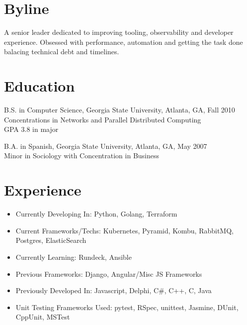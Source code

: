 \documentclass[margin]{res}
\begin{document}

\address{217 Rockyford Rd NE \\ Atlanta, GA 30317 \\
        (678) 773-1545 }

\begin{resume}

\section{Byline}
    A senior leader dedicated to improving tooling, observability and developer experience. Obsessed with
    performance, automation and getting the task done balacing technical debt and timelines.

\section{Education}
    B.S. in Computer Science, Georgia State University, Atlanta, GA, Fall 2010  \\
    Concentrations in Networks and Parallel Distributed Computing \\
    GPA 3.8 in major

    B.A. in Spanish, Georgia State University, Atlanta, GA, May 2007 \\
    Minor in Sociology with Concentration in Business


\section{Experience}
    \begin{itemize} \itemsep -2pt  %
        \item Currently Developing In: Python, Golang, Terraform
        \item Current Frameworks/Techs: Kubernetes, Pyramid, Kombu, RabbitMQ, Postgres, ElasticSearch
        \item Currently Learning: Rundeck, Ansible
        \item Previous Frameworks: Django, Angular/Misc JS Frameworks
        \item Previously Developed In: Javascript, Delphi, C\#, C++, C, Java
        \item Unit Testing Frameworks Used: pytest, RSpec, unittest, Jasmine, DUnit, CppUnit, MSTest
    \end{itemize}


\end{resume}
\end{document}
